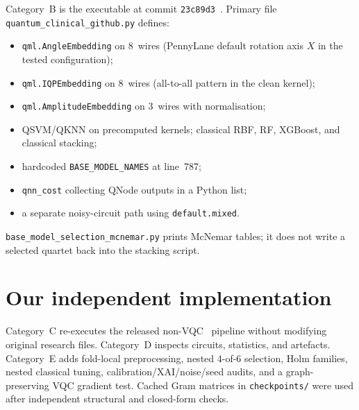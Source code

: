 \documentclass[11pt,a4paper]{article}
\begin{document}
Category~B is the executable at commit \texttt{23c89d3}~\cite{daga2026repo}. Primary file \texttt{quantum\_clinical\_github.py} defines:
\begin{itemize}
  \item \texttt{qml.AngleEmbedding} on 8~wires (PennyLane default rotation axis $X$ in the tested configuration);
  \item \texttt{qml.IQPEmbedding} on 8~wires (all-to-all pattern in the clean kernel);
  \item \texttt{qml.AmplitudeEmbedding} on 3~wires with normalisation;
  \item QSVM/QKNN on precomputed kernels; classical RBF, RF, XGBoost, and classical stacking;
  \item hardcoded \texttt{BASE\_MODEL\_NAMES} at line~787;
  \item \texttt{qnn\_cost} collecting QNode outputs in a Python list;
  \item a separate noisy-circuit path using \texttt{default.mixed}.
\end{itemize}
\texttt{base\_model\_selection\_mcnemar.py} prints McNemar tables; it does not write a selected quartet back into the stacking script.

\section{Our independent implementation}
\label{sec:ours}

Category~C re-executes the released non-VQC \wdbc\ pipeline without modifying original research files. Category~D inspects circuits, statistics, and artefacts. Category~E adds fold-local preprocessing, nested 4-of-6 selection, Holm families, nested classical tuning, calibration/XAI/noise/seed audits, and a graph-preserving VQC gradient test. Cached Gram matrices in \texttt{checkpoints/} were used after independent structural and closed-form checks.



















\end{document}
